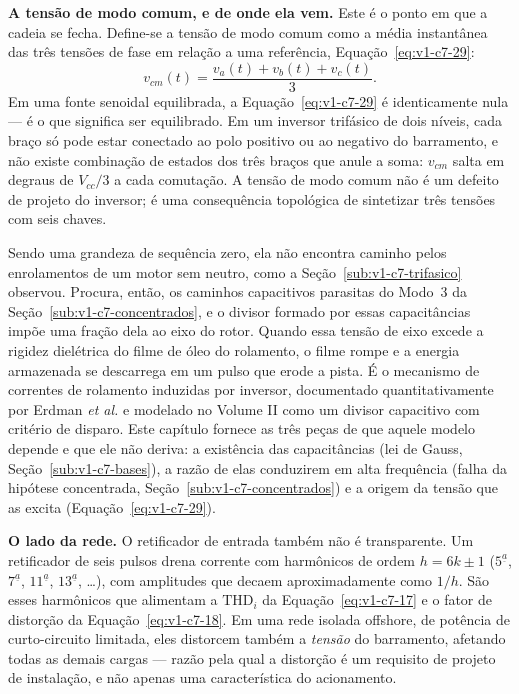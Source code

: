 \documentclass[12pt,a4paper]{article}
\numberwithin{equation}{section}
\numberwithin{table}{section}
\numberwithin{figure}{section}
\begin{document}
\textbf{A tensão de modo comum, e de onde ela vem.} Este é o ponto em que a
cadeia se fecha. Define-se a tensão de modo comum como a média instantânea das
três tensões de fase em relação a uma referência,
Equação~\eqref{eq:v1-c7-29}:
\begin{equation}\label{eq:v1-c7-29}
v_{cm}(t) = \frac{v_a(t) + v_b(t) + v_c(t)}{3} .
\end{equation}
Em uma fonte senoidal equilibrada, a Equação~\eqref{eq:v1-c7-29} é
identicamente nula --- é o que significa ser equilibrado. Em um inversor
trifásico de dois níveis, cada braço só pode estar conectado ao polo positivo
ou ao negativo do barramento, e não existe combinação de estados dos três
braços que anule a soma: $v_{cm}$ salta em degraus de $V_{cc}/3$ a cada
comutação. A tensão de modo comum não é um defeito de projeto do inversor; é
uma consequência topológica de sintetizar três tensões com seis chaves.

Sendo uma grandeza de sequência zero, ela não encontra caminho pelos
enrolamentos de um motor sem neutro, como a
Seção~\ref{sub:v1-c7-trifasico} observou. Procura, então, os caminhos
capacitivos parasitas do Modo~3 da Seção~\ref{sub:v1-c7-concentrados}, e o
divisor formado por essas capacitâncias impõe uma fração dela ao eixo do rotor.
Quando essa tensão de eixo excede a rigidez dielétrica do filme de óleo do
rolamento, o filme rompe e a energia armazenada se descarrega em um pulso que
erode a pista. É o mecanismo de correntes de rolamento induzidas por inversor,
documentado quantitativamente por Erdman \textit{et al.} \cite{erdman} e
modelado no Volume II como um divisor capacitivo com critério de disparo. Este
capítulo fornece as três peças de que aquele modelo depende e que ele não
deriva: a existência das capacitâncias (lei de Gauss,
Seção~\ref{sub:v1-c7-bases}), a razão de elas conduzirem em alta frequência
(falha da hipótese concentrada, Seção~\ref{sub:v1-c7-concentrados}) e a origem
da tensão que as excita (Equação~\eqref{eq:v1-c7-29}).

\textbf{O lado da rede.} O retificador de entrada também não é transparente. Um
retificador de seis pulsos drena corrente com harmônicos de ordem
$h = 6k\pm1$ ($5^{\underline{a}}$, $7^{\underline{a}}$, $11^{\underline{a}}$,
$13^{\underline{a}}$, \dots), com amplitudes que decaem aproximadamente como
$1/h$. São esses harmônicos que alimentam a $\mathrm{THD}_i$ da
Equação~\eqref{eq:v1-c7-17} e o fator de distorção da
Equação~\eqref{eq:v1-c7-18}. Em uma rede isolada offshore, de potência de
curto-circuito limitada, eles distorcem também a \emph{tensão} do barramento,
afetando todas as demais cargas --- razão pela qual a distorção é um requisito
de projeto de instalação, e não apenas uma característica do acionamento.
\end{document}
